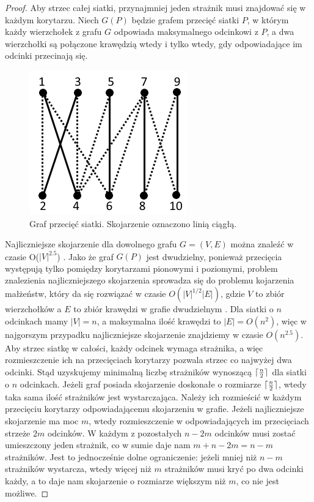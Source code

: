 \documentclass[brudnopis]{xmgr}
\DeclarePairedDelimiter\ceil{\lceil}{\rceil}
\theoremstyle{definition}
\begin{document}
\begin{proof}
Aby strzec całej siatki, przynajmniej jeden strażnik musi znajdować się w każdym korytarzu. Niech $G(P)$ będzie grafem przecięć siatki $P$, w którym każdy wierzchołek z grafu $G$ odpowiada maksymalnego odcinkowi z $P$, a dwa wierzchołki są połączone krawędzią wtedy i tylko wtedy, gdy odpowiadające im odcinki przecinają się.

 \begin{figure}[ht!]
   \centering
   \includegraphics{rysunki/graf_skojarzen.png}
   \caption{Graf przecięć siatki. Skojarzenie oznaczono linią ciągłą.}
   \label{fig:graf przeciec}
 \end{figure} 

 Najliczniejsze skojarzenie dla dowolnego grafu $G = (V,E)$ można znaleźć w czasie O($|V|^{2.5}$) \cite{even}. Jako że graf $G(P)$ jest dwudzielny, ponieważ przecięcia występują tylko pomiędzy korytarzami pionowymi i poziomymi, problem znalezienia najliczniejszego skojarzenia sprowadza się do problemu kojarzenia małżeństw, który da się rozwiązać w czasie $O(|V|^{1/2}|E|)$, gdzie $V$ to zbiór wierzchołków a $E$ to zbiór krawędzi w grafie dwudzielnym \cite{even}. Dla siatki o $n$ odcinkach mamy $|V| = n$, a maksymalna ilość krawędzi to $|E| = O(n^2)$, więc w najgorszym przypadku najliczniejsze skojarzenie znajdziemy w czasie $O(n^{2.5})$.
 \\\indent Aby strzec siatkę w całości, każdy odcinek wymaga strażnika, a więc rozmieszczenie ich na przecięciach korytarzy pozwala strzec co najwyżej dwa odcinki. Stąd uzyskujemy minimalną liczbę strażników wynoszącą $\ceil{\frac{n}{2}}$ dla siatki o $n$ odcinkach. Jeżeli graf posiada skojarzenie doskonałe o rozmiarze $\ceil{\frac{n}{2}}$, wtedy taka sama ilość strażników jest wystarczająca. Należy ich rozmieścić w każdym przecięciu korytarzy odpowiadającemu skojarzeniu w grafie. Jeżeli najliczniejsze skojarzenie ma moc $m$, wtedy rozmieszczenie w odpowiadających im przecięciach strzeże $2m$ odcinków. W każdym z pozostałych $n - 2m$ odcinków musi zostać umieszczony jeden strażnik, co w sumie daje nam $m + n - 2m = n - m$ strażników. Jest to jednocześnie dolne ograniczenie: jeżeli mniej niż $n - m$ strażników wystarcza, wtedy więcej niż $m$ strażników musi kryć po dwa odcinki każdy, a to daje nam skojarzenie o rozmiarze większym niż $m$, co nie jest możliwe.
\end{proof}
\end{document}
